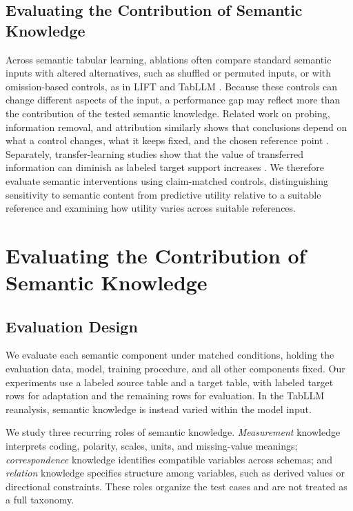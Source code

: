 \documentclass{article} %
\begin{document}
\subsection{Evaluating the Contribution of Semantic Knowledge}

Across semantic tabular learning, ablations often compare standard semantic inputs with altered alternatives, such as shuffled or permuted inputs, or with omission-based controls, as in LIFT and TabLLM \citep{dinh2022lift,hegselmann2023tabllm}.
Because these controls can change different aspects of the input, a performance gap may reflect more than the contribution of the tested semantic knowledge.
Related work on probing, information removal, and attribution similarly shows that conclusions depend on what a control changes, what it keeps fixed, and the chosen reference point \citep{hewitt2019designing,fisher2019all,elazar2021amnesic,sturmfels2020visualizing}.
Separately, transfer-learning studies show that the value of transferred information can diminish as labeled target support increases \citep{he2019rethinking,tripuraneni2020theory,zoph2020rethinking,nguyen2020leep}.
We therefore evaluate semantic interventions using claim-matched controls, distinguishing sensitivity to semantic content from predictive utility relative to a suitable reference and examining how utility varies across suitable references.

\section{Evaluating the Contribution of Semantic Knowledge}
\label{sec:method}

\subsection{Evaluation Design}
\label{sec:evaluation_design}

We evaluate each semantic component under matched conditions, holding the evaluation data, model, training procedure, and all other components fixed.
Our experiments use a labeled source table and a target table, with labeled target rows for adaptation and the remaining rows for evaluation.
In the TabLLM reanalysis, semantic knowledge is instead varied within the model input.

We study three recurring roles of semantic knowledge.
\emph{Measurement} knowledge interprets coding, polarity, scales, units, and missing-value meanings;
\emph{correspondence} knowledge identifies compatible variables across schemas;
and \emph{relation} knowledge specifies structure among variables, such as derived values or directional constraints.
These roles organize the test cases and are not treated as a full taxonomy.
\end{document}
